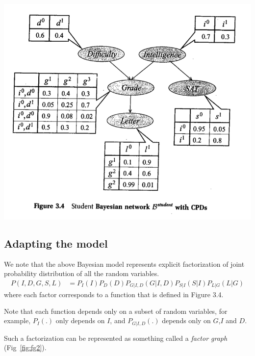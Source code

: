 \documentclass[12pt,oneside,letterpaper]{article}
\begin{document}
\includegraphics[width=\textwidth]{media/examplebayesnet.png}

\subsection{Adapting the model}
We note that the above Bayesian model represents explicit factorization of
joint probability distribution of all the random variables.
\begin{align}
  P(I, D, G, S, L) &= P_I(I)P_D(D)P_{G|I,D}(G|I, D)P_{S|I}(S|I)P_{L|G}(L|G)
\end{align}
where each factor corresponds to a function that is defined in Figure 3.4.

Note that each function depends only on a subset of random variables, for
example, $P_I(.)$ only depends on $I$, and $P_{G|I,D}(.)$ depends only on
$G$,$I$ and $D$.

Such a factorization can be represented as something called a \emph{factor
graph} (Fig~\ref{fig:fg2}). 
\end{document}
